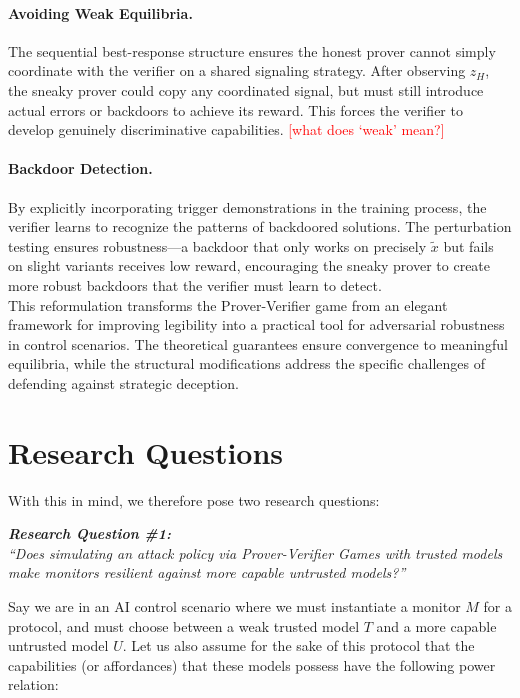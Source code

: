 \paragraph{Avoiding Weak Equilibria.} The sequential best-response structure ensures the honest prover cannot simply coordinate with the verifier on a shared signaling strategy. After observing $z_H$, the sneaky prover could copy any coordinated signal, but must still introduce actual errors or backdoors to achieve its reward. This forces the verifier to develop genuinely discriminative capabilities. \textcolor{red}{[what does `weak' mean?]}

\paragraph{Backdoor Detection.} By explicitly incorporating trigger demonstrations in the training process, the verifier learns to recognize the patterns of backdoored solutions. The perturbation testing ensures robustness—a backdoor that only works on precisely $\tilde{x}$ but fails on slight variants receives low reward, encouraging the sneaky prover to create more robust backdoors that the verifier must learn to detect.
\\
This reformulation transforms the Prover-Verifier game from an elegant framework for improving legibility into a practical tool for adversarial robustness in control scenarios. The theoretical guarantees ensure convergence to meaningful equilibria, while the structural modifications address the specific challenges of defending against strategic deception.

\section{Research Questions}
With this in mind, we therefore pose two  research questions:

\begin{tcolorbox}[
    colback=gray!10,
    colframe=black,
    boxrule=0.5pt,
    arc=3mm,
    left=10pt,
    right=10pt,
    top=8pt,
    bottom=8pt
]
\centering
\textit{\textbf{\normalsize Research Question \#1:}} \\[0.3em]
\textit{``Does simulating an attack policy via Prover-Verifier Games with trusted models make monitors resilient against more capable untrusted models?''}
\end{tcolorbox}\noindent
Say we are in an AI control scenario where we must instantiate a monitor $M$ for a protocol, and must choose between a weak trusted model $T$ and a more capable untrusted model $U$. Let us also assume for the sake of this protocol that the capabilities (or affordances) that these models possess have the following power relation:

